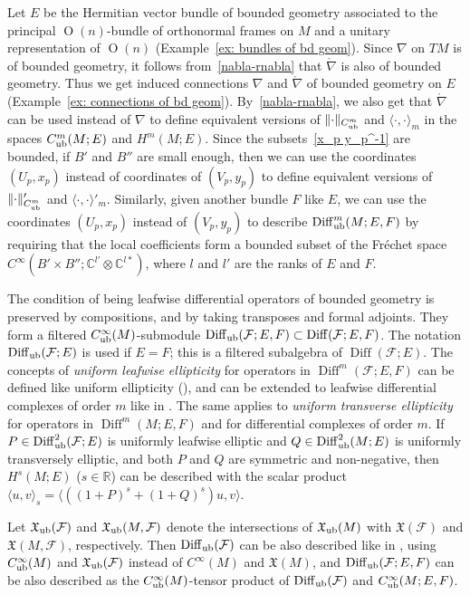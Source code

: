 \documentclass{memo-l}
\theoremstyle{plain}
\theoremstyle{definition}
\theoremstyle{remark}
\newcommand{\C}{\mathbb{C}}
\newcommand{\R}{\mathbb{R}}
\newcommand{\FF}{\mathcal{F}}
\newcommand{\fX}{\mathfrak{X}}
\newcommand{\Diff}{\operatorname{Diff}}
\newcommand{\rnabla}{\mathring{\nabla}}
\newcommand{\Diffub}{\Diff_{\text{\rm ub}}}
\newcommand{\Cinftyub}{C^\infty_{\text{\rm ub}}}
\newcommand{\fXub}{\fX_{\text{\rm ub}}}
\numberwithin{section}{chapter}
\numberwithin{equation}{section}%
\begin{document}
Let $E$ be the Hermitian vector bundle of bounded geometry associated to the principal $\operatorname{O}(n)$-bundle of orthonormal frames on $M$ and a unitary representation of $\operatorname{O}(n)$ (Example~\ref{ex: bundles of bd geom}). Since $\nabla$ on $TM$ is of bounded geometry, it follows from~\eqref{nabla-rnabla} that $\rnabla$ is also of bounded geometry. Thus we get induced connections $\nabla$ and $\rnabla$ of bounded geometry on $E$ (Example~\ref{ex: connections of bd geom}). By~\eqref{nabla-rnabla}, we also get that $\rnabla$ can be used instead of $\nabla$ to define equivalent versions of $\|{\cdot}\|_{C_{\text{\rm ub}}^m}$ and $\langle\cdot,\cdot\rangle_m$ in the spaces $C_{\text{\rm ub}}^m(M;E)$ and $H^m(M;E)$.  Since the subsets~\eqref{x_p y_p^-1} are bounded, if $B'$ and $B''$ are small enough, then we can use the coordinates $(U_p,x_p)$ instead of coordinates of $(V_p,y_p)$ to define equivalent versions of $\|{\cdot}\|'_{C_{\text{\rm ub}}^m}$ and $\langle\cdot,\cdot\rangle'_m$. Similarly, given another bundle $F$ like $E$, we can use the coordinates $(U_p,x_p)$ instead of $(V_p,y_p)$ to describe $\Diffub^m(M;E,F)$ by requiring that the local coefficients form a bounded subset of the Fr\'echet space $C^\infty(B'\times B'';\C^{l'}\otimes\C^{l*})$, where $l$ and $l'$ are the ranks of $E$ and $F$.

The condition of being leafwise differential operators of bounded geometry is preserved by compositions, and by taking transposes and formal adjoints. They form a filtered $\Cinftyub(M)$-submodule $\Diffub(\FF;E,F)\subset\Diff(\FF;E,F)$. The notation $\Diffub(\FF;E)$\index{$\Diffub(\FF;E)$} is used if $E=F$; this is a filtered subalgebra of $\Diff(\FF;E)$. The concepts of \emph{uniform leafwise ellipticity} for operators in $\Diff^m(\FF;E,F)$ can be defined like uniform ellipticity (), and can be extended to leafwise differential complexes of order $m$ like in . The same applies to \emph{uniform transverse ellipticity} for operators in $\Diff^m(M;E,F)$ and for differential complexes of order $m$. If $P\in\Diffub^2(\FF;E)$ is uniformly leafwise elliptic and $Q\in\Diffub^2(M;E)$ is uniformly transversely elliptic, and both $P$ and $Q$ are symmetric and non-negative, then $H^s(M;E)$ ($s\in\R$) can be described with the scalar product $\langle u,v\rangle_s=\langle((1+P)^s+(1+Q)^s)u,v\rangle$. 

Let $\fXub(\FF)$\index{$\fXub(\FF)$} and $\fXub(M,\FF)$\index{$\fXub(M,\FF)$} denote the intersections of $\fXub(M)$ with $\fX(\FF)$ and $\fX(M,\FF)$, respectively. Then $\Diff_{\text{\rm ub}}(\FF)$ can be also described like in , using $\Cinftyub(M)$ and $\fXub(\FF)$ instead of $C^\infty(M)$ and $\fX(M)$, and $\Diffub(\FF;E,F)$ can be also described as the $\Cinftyub(M)$-tensor product of $\Diff_{\text{\rm ub}}(\FF)$ and $\Cinftyub(M;E,F)$.
\end{document}
